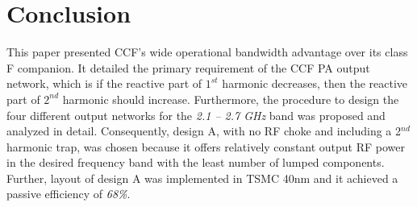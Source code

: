 \documentclass[conference]{IEEEtran}
\begin{document}


\section{Conclusion}
\label{section:Conclusion}
This paper presented CCF's wide operational bandwidth advantage over its class F companion. It detailed the primary requirement of the CCF PA output network, which is if the reactive part of $1^{st}$ harmonic decreases, then the reactive part of $2^{nd}$ harmonic should increase. Furthermore, the procedure to design the four different output networks for the \textit{2.1 -- 2.7 GHz} band was proposed and analyzed in detail.  Consequently, design A, with no RF choke and  including a 2$^{nd}$ harmonic trap, was chosen because it offers relatively constant output RF power in the desired frequency band with the least number of lumped components. Further, layout of design A was implemented in TSMC 40nm and it achieved a passive efficiency of \textit{68\%}.



\end{document}
